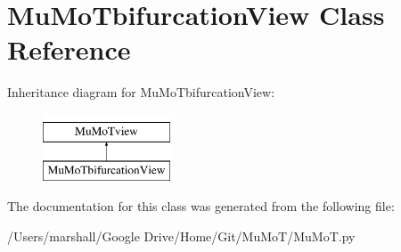 \hypertarget{class_mu_mo_t_1_1_mu_mo_tbifurcation_view}{}\section{Mu\+Mo\+Tbifurcation\+View Class Reference}
\label{class_mu_mo_t_1_1_mu_mo_tbifurcation_view}
Inheritance diagram for Mu\+Mo\+Tbifurcation\+View\+:\begin{figure}[H]
\begin{center}
\leavevmode
\includegraphics[height=2.000000cm]{class_mu_mo_t_1_1_mu_mo_tbifurcation_view}
\end{center}
\end{figure}


The documentation for this class was generated from the following file\+:\begin{DoxyCompactItemize}
\item 
/\+Users/marshall/\+Google Drive/\+Home/\+Git/\+Mu\+Mo\+T/Mu\+Mo\+T.\+py\end{DoxyCompactItemize}
